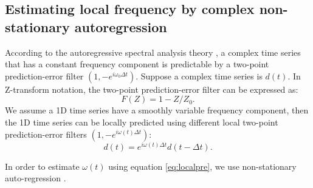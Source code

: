 

\subsection{Estimating local frequency by complex non-stationary autoregression}
According to the autoregressive spectral analysis theory \cite[]{marple}, a complex time series that has a constant frequency component is predictable by a two-point prediction-error filter $(1,-e^{i\omega_0\Delta t})$. Suppose a complex time series is $d(t)$. In Z-transform notation, the two-point prediction-error filter can be expressed as:
\begin{equation}
\label{eq:twopre}
F(Z)=1-Z/Z_0.
\end{equation} 
We assume a 1D time series have a smoothly variable frequency component, then the 1D time series can be locally predicted using different local two-point prediction-error filters $(1,-e^{i\omega(t)\Delta t})$:
\begin{equation}
\label{eq:localpre}
d(t)=e^{i\omega(t)\Delta t}d(t-\Delta t).
\end{equation}

In order to estimate $\omega(t)$ using equation \ref{eq:localpre}, we 
use non-stationary auto-regression \cite[]{fomel20095,fomel20132}.

